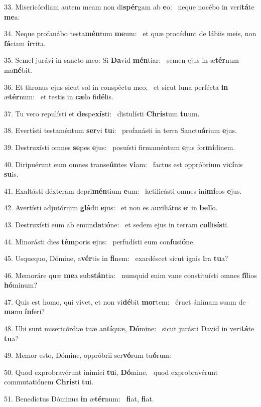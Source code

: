 33. Misericórdiam autem meam non di\textbf{spér}gam ab \textbf{e}o: \ast\  neque nocébo in veri\textbf{tá}te \textbf{me}a:\

34. Neque profanábo testa\textbf{mén}tum \textbf{me}um: \ast\  et quæ procédunt de lábiis meis, non \textbf{fá}ciam \textbf{ír}rita.\

35. Semel jurávi in sancto meo: Si \textbf{Da}vid \textbf{mén}tiar: \ast\  semen ejus in æ\textbf{tér}num ma\textbf{né}bit.\

36. Et thronus ejus sicut sol in conspéctu meo, \dag\  et sicut luna perfécta \textbf{in} æ\textbf{tér}num: \ast\  et testis in \textbf{cæ}lo fi\textbf{dé}lis.\

37. Tu vero repulísti et \textbf{de}spe\textbf{xís}ti: \ast\  distulísti \textbf{Chris}tum \textbf{tu}um.\

38. Evertísti testaméntum \textbf{ser}vi \textbf{tu}i: \ast\  profanásti in terra Sanctu\textbf{á}rium \textbf{e}jus.\

39. Destruxísti omnes \textbf{se}pes \textbf{e}jus: \ast\  posuísti firmaméntum \textbf{e}jus for\textbf{mí}dinem.\

40. Diripuérunt eum omnes transe\textbf{ún}tes \textbf{vi}am: \ast\  factus est oppróbrium vi\textbf{cí}nis \textbf{su}is.\

41. Exaltásti déxteram depri\textbf{mén}tium \textbf{e}um: \ast\  lætificásti omnes ini\textbf{mí}cos \textbf{e}jus.\

42. Avertísti adjutórium \textbf{glá}dii \textbf{e}jus: \ast\  et non es auxiliátus \textbf{e}i in \textbf{bel}lo.\

43. Destruxísti eum ab emun\textbf{da}ti\textbf{ó}ne: \ast\  et sedem ejus in terram \textbf{col}li\textbf{sís}ti.\

44. Minorásti dies \textbf{tém}poris \textbf{e}jus: \ast\  perfudísti eum con\textbf{fu}si\textbf{ó}ne.\

45. Usquequo, Dómine, a\textbf{vér}tis in \textbf{fi}nem: \ast\  exardéscet sicut ignis \textbf{i}ra \textbf{tu}a?\

46. Memoráre quæ \textbf{me}a sub\textbf{stán}tia: \ast\  numquid enim vane constituísti omnes \textbf{fí}lios \textbf{hó}minum?\

47. Quis est homo, qui vivet, et non vi\textbf{dé}bit \textbf{mor}tem: \ast\  éruet ánimam suam de \textbf{ma}nu \textbf{ín}feri?\

48. Ubi sunt misericórdiæ tuæ an\textbf{tí}quæ, \textbf{Dó}mine: \ast\  sicut jurásti David in veri\textbf{tá}te \textbf{tu}a?\

49. Memor esto, Dómine, oppróbrii ser\textbf{vó}rum tu\textbf{ó}rum: \ast\  \

50. Quod exprobravérunt inimíci \textbf{tu}i, \textbf{Dó}mine, \ast\  quod exprobravérunt commutatiónem \textbf{Chris}ti \textbf{tu}i.\

51. Benedíctus Dóminus \textbf{in} æ\textbf{tér}num: \ast\  \textbf{fi}at, \textbf{fi}at.\

